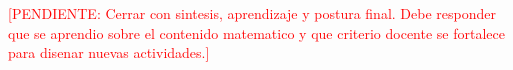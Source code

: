 \documentclass[
	spanish,
	letterpaper, oneside
]{article}
\newcommand{\pendiente}[1]{\textcolor{red}{[PENDIENTE: #1]}}
\begin{document}
\pendiente{Cerrar con sintesis, aprendizaje y postura final. Debe responder que se aprendio sobre el contenido matematico y que criterio docente se fortalece para disenar nuevas actividades.}



\nocite{iiiepeMAEM,iiiepeSitio,sepFase6,nctmPrinciplesActions}


\end{document}
